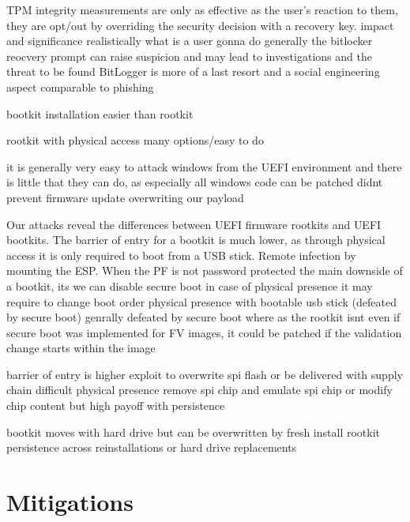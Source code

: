\ac{TPM} integrity measurements are only as effective as the user's reaction to them, they are opt\-/out by overriding the security decision with a recovery key.
impact and significance
realistically what is a user gonna do
generally the bitlocker reocvery prompt can raise suspicion and may lead to investigations and the threat to be found
BitLogger is more of a last resort and a social engineering aspect comparable to phishing


bootkit installation easier than rootkit

rootkit with physical access many options/easy to do


it is generally very easy to attack windows from the \ac{UEFI} environment and there is little that they can do, as especially all windows code can be patched
didnt prevent firmware update overwriting our payload




Our attacks reveal the differences between \ac{UEFI} firmware rootkits and \ac{UEFI} bootkits.
The barrier of entry for a bootkit is much lower, as through physical access it is only required to boot from a \ac{USB} stick.
Remote infection by mounting the \ac{ESP}.
When the \ac{PF} is not password protected the main downside of a bootkit, its  we can disable secure boot
in case of physical presence it may require to change boot order
physical presence with bootable usb stick (defeated by secure boot)
genrally defeated by secure boot where as the rootkit isnt
even if secure boot was implemented for FV images, it could be patched if the validation change starts within the image

barrier of entry is higher
exploit to overwrite spi flash or be delivered with supply chain difficult
physical presence remove spi chip and emulate spi chip or modify chip content
but high payoff with persistence

bootkit moves with hard drive but can be overwritten by fresh install
rootkit persistence across reinstallations or hard drive replacements







\section{Mitigations}


